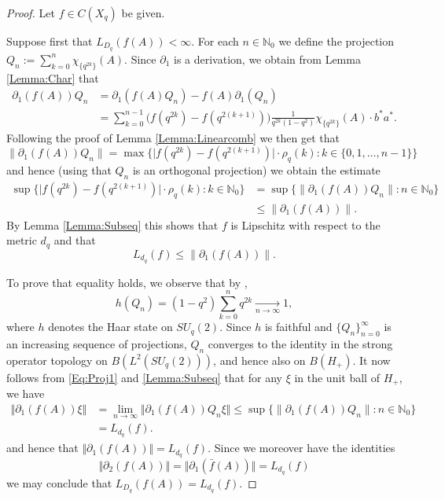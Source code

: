 \documentclass[11pt, reqno, a4paper, final]{amsart}
\theoremstyle{plain}
\theoremstyle{definition}
\newcommand{\NN}{{\mathbb N}}
\newcommand{\To}{\longrightarrow}
\newcommand{\del}{{\partial}}
\renewcommand{\leq}{\leqslant}
\newcommand{\Lip}{\operatorname{Lip}}
\newcommand{\black}{\color{black}}
\begin{document}
\begin{proof}
{\black Let $f \in C(X_q)$ be given. 

Suppose first that $L_{D_q}(f(A)) < \infty$. For each $n \in \NN_0$ we define the projection $Q_n := \sum_{k = 0}^n \chi_{ \{q^{2k}\}}(A)$. Since $\partial_1$ is a derivation, we obtain from Lemma \ref{Lemma:Char} that
\[
\begin{split}
\partial_{1} (f(A)) Q_n & = \partial_1(f(A) Q_n )-f(A)\partial_1( Q_n) \\
& =  \sum_{k = 0}^{n-1} \big( f(q^{2k}) - f(q^{2(k+1)}) \big) \frac{1}{q^{2k} (1 - q^2)} \chi_{ \{q^{2k}\}}(A) \cdot b^* a^* .
\end{split}
\]
Following the proof of {\black Lemma \ref{Lemma:Linearcomb}} we then get that
\begin{equation}
\| \partial_{1} (f(A)) Q_n \| 
= \max\{ \vert f(q^{2k}) - f(q^{2(k+1)}) \vert \cdot \rho_q(k) : k \in \{0,1,\ldots,n-1\} \} 
\end{equation}
and hence (using that $Q_n$ is an orthogonal projection) we obtain the estimate
\begin{equation}\label{Eq:Proj1}
\begin{split}
\sup\{ \vert f(q^{2k}) - f(q^{2(k+1)}) \vert \cdot \rho_q(k) : k \in \NN_0 \}
& = \sup\{ \| \partial_{1} (f(A)) Q_n \|  : n \in \NN_0 \} \\ 
& \leq \| \partial_1( f(A))\|  .
\end{split}
\end{equation}
By Lemma \ref{Lemma:Subseq} this shows that $f$ is Lipschitz with respect to the metric $d_q$ and that
\[
L_{d_q}(f) \leq \| \partial_1(f(A)) \| .
\]}
To prove that equality holds, we observe that by \cite[Theorem 6.2.17]{Timmermann}, 
\[
h(Q_n)= (1-q^2) \sum_{k=0}^n q^{2k}\underset{n\to \infty}{\To} 1,
\]
where $h$ denotes the Haar state on $SU_q(2)$. Since $h$ is faithful and $\lbrace Q_n \rbrace_{n = 0}^\infty$ is an increasing sequence of projections, $Q_n$ converges to the identity in the strong operator topology on $B(L^2(SU_q(2)))$, and hence also on {\black $B(H_+)$}. It now follows from \eqref{Eq:Proj1} and \ref{Lemma:Subseq} that for any $\xi$ in the unit ball of {\black $H_+$}, we have
\begin{align*}
\Vert \partial_1(f(A))\xi \Vert &= \lim_{n\to \infty} \Vert \partial_1(f(A))Q_n\xi \Vert   
\leq \sup\{ \|\del_1(f(A))Q_n \| : n \in \NN_0 \}\\
&= L_{d_q}( f) .
\end{align*}
and {\black hence that $\Vert \partial_1(f(A))\Vert = L_{d_q}(f)$. Since we moreover have the identities 
\[
\Vert \partial_2(f(A))\Vert = \Vert \partial_1( \bar{f}(A)) \Vert = L_{d_q}(f)
\]
we may conclude that $L_{D_q}(f(A)) = L_{d_q}(f)$.}


\end{proof}
\end{document}
